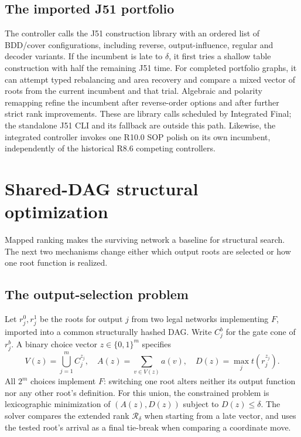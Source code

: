 \documentclass[journal,10pt]{IEEEtran}
\newcommand{\rank}{\mathcal{R}}
\begin{document}
\subsection{The imported J51 portfolio}
The controller calls the J51 construction library with an ordered list of BDD/cover configurations, including reverse, output-influence, regular and decoder variants. If the incumbent is late to \(\delta\), it first tries a shallow table construction with half the remaining J51 time. For completed portfolio graphs, it can attempt typed rebalancing and area recovery and compare a mixed vector of roots from the current incumbent and that trial. Algebraic and polarity remapping refine the incumbent after reverse-order options and after further strict rank improvements. These are library calls scheduled by Integrated Final; the standalone J51 CLI and its fallback are outside this path. Likewise, the integrated controller invokes one R10.0 SOP polish on its own incumbent, independently of the historical R8.6 competing controllers.

\section{Shared-DAG structural optimization}
\label{sec:mix}
Mapped ranking makes the surviving network a baseline for structural search. The next two mechanisms change either which output roots are selected or how one root function is realized.
\subsection{The output-selection problem}
Let \(r_j^0,r_j^1\) be the roots for output \(j\) from two legal networks implementing \(F\), imported into a common structurally hashed DAG. Write \(C_j^b\) for the gate cone of \(r_j^b\). A binary choice vector \(z\in\{0,1\}^m\) specifies
\begin{equation}
 V(z)=\bigcup_{j=1}^m C_j^{z_j},\quad
 A(z)=\sum_{v\in V(z)}a(v),\quad
 D(z)=\max_j t(r_j^{z_j}).
 \label{eq:choices}
\end{equation}
All \(2^m\) choices implement \(F\): switching one root alters neither its output function nor any other root's definition. For this union, the constrained problem is lexicographic minimization of \((A(z),D(z))\) subject to \(D(z)\le\delta\). The solver compares the extended rank \(\rank_\delta\) when starting from a late vector, and uses the tested root's arrival as a final tie-break when comparing a coordinate move.
\end{document}
